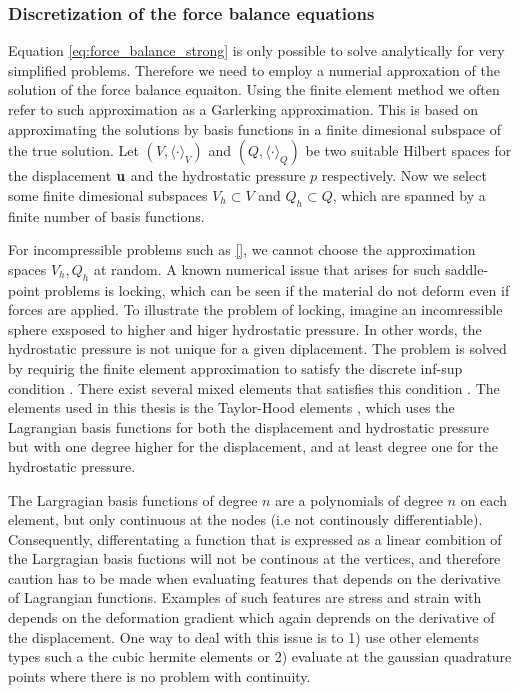 \subsubsection{Discretization of the force balance equations}

Equation \eqref{eq:force_balance_strong} is only possible to solve analytically for
very simplified problems. Therefore we need to employ a numerial
approxation of the solution of the force balance equaiton. Using the
finite element method we often refer to such approximation as a
Garlerking approximation. This is based on approximating the solutions
by basis functions in a finite dimesional subspace of the true
solution. Let $(V, \langle \cdot \rangle_V)$
and $(Q, \langle \cdot \rangle_Q)$ be two suitable Hilbert
spaces for the displacement $\mathbf{u}$ and the hydrostatic pressure $p$
respectively. Now we select some finite dimesional subspaces $V_h
\subset V$ and $Q_h \subset Q$, which are spanned by a finite number
of basis functions.

For incompressible problems such as \eqref{}, we cannot choose the
approximation spaces $V_h, Q_h$ at random. A known numerical issue
that arises for such saddle-point problems is locking, which can be
seen if the material do not deform even if forces are applied. To
illustrate the problem of locking, imagine an incomressible sphere
exsposed to higher and higer hydrostatic pressure. In other words, the
hydrostatic pressure is not unique for a given diplacement. The
problem is solved by requirig the finite element approximation to
satisfy the discrete inf-sup condition \cite{arnold1984stable}. There
exist several mixed elements that satisfies this condition
\cite{chapelle1993inf}. The elements used in this thesis is the
Taylor-Hood elements \cite{taylor1973numerical}, which uses the
Lagrangian basis functions for both the displacement and hydrostatic
pressure but with one degree higher for the displacement, and at least
degree one for the hydrostatic pressure. 

\begin{remark}
  The Largragian basis functions of degree $n$ are a polynomials of
  degree $n$ on each element, but only continuous at the nodes (i.e
  not continously differentiable). Consequently, differentating a
  function that is expressed as a linear combition of the Largragian
  basis fuctions will not be continous at the vertices, and therefore
  caution has to be made when evaluating features that depends on the
  derivative of Lagrangian functions. Examples of such features are
  stress and strain with depends on the deformation gradient which
  again deprends on the derivative of the displacement. One
  way to deal with this issue is to 1) use other elements types such a
  the cubic hermite elements or 2) evaluate at the gaussian quadrature
  points where there is no problem with continuity.
\end{remark}


